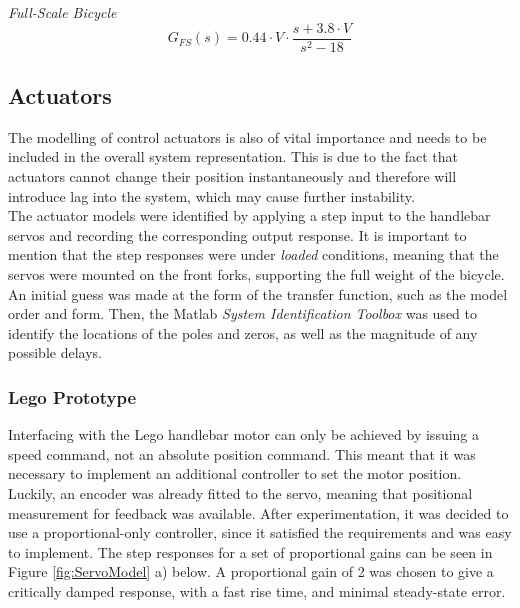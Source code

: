 \textit{Full-Scale Bicycle} \\

\begin{equation}
G_{FS}(s) = 0.44 \cdot V \cdot \frac{s + 3.8 \cdot V}{s^2 - 18}
\label{eq:2ndOrderFS}
\end{equation}

\subsection{Actuators}
The modelling of control actuators is also of vital importance and needs to be included in the overall system representation. This is due to the fact that actuators cannot change their position instantaneously and therefore will introduce lag into the system, which may cause further instability. \\

The actuator models were identified by applying a step input to the handlebar servos and recording the corresponding output response. It is important to mention that the step responses were under \textit{loaded} conditions, meaning that the servos were mounted on the front forks, supporting the full weight of the bicycle. \\

An initial guess was made at the form of the transfer function, such as the model order and form. Then, the Matlab \textit{System Identification Toolbox} was used to identify the locations of the poles and zeros, as well as the magnitude of any possible delays.

\subsubsection{Lego Prototype}
Interfacing with the Lego handlebar motor can only be achieved by issuing a speed command, not an absolute position command. This meant that it was necessary to implement an additional controller to set the motor position. Luckily, an encoder was already fitted to the servo, meaning that positional measurement for feedback was available. After experimentation, it was decided to use a proportional-only controller, since it satisfied the requirements and was easy to implement. The step responses for a set of proportional gains can be seen in Figure \ref{fig:ServoModel} a) below. A proportional gain of 2 was chosen to give a critically damped response, with a fast rise time, and minimal steady-state error. \\

